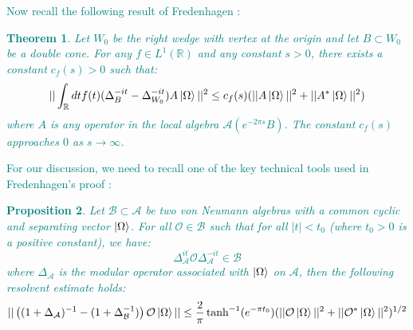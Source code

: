 \documentclass[a4paper,11pt]{article}
\newtheorem{theorem}{Theorem}
\newtheorem{proposition}[theorem]{Proposition}
\theoremstyle{definition}
\newcommand{\lb}{\left(}
\newcommand{\rb}{\right)}
\newcommand{\YC}[1]{\textcolor{teal}{#1}}
\begin{document}
\YC{
Now recall the following result of Fredenhagen \cite{fredenhagen}:
\begin{theorem}
    Let $W_0$ be the right wedge with vertex at the origin and let $B\subset W_0$ be a double cone. For any $f\in L^1(\mathbb{R})$ and any constant $s > 0$, there exists a constant $c_f(s) > 0$ such that:
    \begin{equation}
        ||\int_\mathbb{R} dt f(t)(\Delta_{B}^{-it} - \Delta_{W_0}^{-it})A\ket{\Omega}||^2 \leq c_f(s)(||A\ket{\Omega}||^2 + ||A^*\ket{\Omega}||^2)
    \end{equation}
    where $A$ is any operator in the local algebra $\mathcal{A}(e^{-2\pi s}B)$. The constant $c_f(s)$ approaches $0$ as $s\rightarrow \infty$.
\end{theorem}
}
\YC{
For our discussion, we need to recall one of the key technical tools used in Fredenhagen's proof \cite{fredenhagen}:
\begin{proposition}
    Let $\mathcal{B}\subset \mathcal{A}$ be two von Neumann algebras with a common cyclic and separating vector $\ket{\Omega}$. For all $\mathcal{O}\in\mathcal{B}$ such that for all $|t| < t_0$ (where $t_0 > 0$ is a positive constant), we have:
    \begin{equation}
        \Delta_\mathcal{A}^{it}\mathcal{O}\Delta_\mathcal{A}^{-it}\in\mathcal{B}
    \end{equation}
    where $\Delta_\mathcal{A}$ is the modular operator associated with $\ket{\Omega}$ on $\mathcal{A}$, then the following resolvent estimate holds:
    \begin{equation}
        ||\lb(1 + \Delta_\mathcal{A})^{-1} - (1 + \Delta_\mathcal{B}^{-1})\rb\mathcal{O}\ket{\Omega}|| \leq \frac{2}{\pi}\tanh^{-1}(e^{-\pi t_0})(||\mathcal{O}\ket{\Omega}||^2 + ||\mathcal{O}^*\ket{\Omega}||^2)^{1/2}
    \end{equation}
\end{proposition}
}
\end{document}
